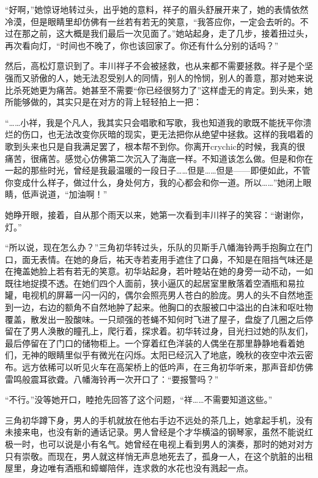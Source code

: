 \documentclass{article}
\begin{document}
“好啊，”她惊讶地转过头，出乎她的意料，祥子的眉头舒展开来了，她的表情依然冷漠，但是眼睛里却仿佛有一丝若有若无的笑意，“我答应你，一定会去听的。不过在那之前，这大概是我们最后一次见面了。”她站起身，走了几步，接着扭过头，再次看向灯，“时间也不晚了，你也该回家了。你还有什么分别的话吗？”



然后，高松灯意识到了。丰川祥子不会被拯救，也从来都不需要拯救。祥子是个坚强而又骄傲的人，她无法忍受别人的同情，别人的怜悯，别人的善意，那对她来说比杀死她更为痛苦。她甚至不需要“你已经很努力了”这样虚无的肯定。到头来，她所能够做的，其实只是在对方的背上轻轻拍上一把：



“……小祥，我是个凡人，我其实只会唱歌和写歌，我也知道我的歌既不能抚平你溃烂的伤口，也无法改变你灰暗的现实，更无法把你从绝望中拯救。这样的我唱着的歌到头来也只是自我满足罢了，根本帮不到你。你离开crychic的时候，我真的很痛苦，很痛苦。感觉心仿佛第二次沉入了海底一样。不知道该怎么做。但是和你在一起的那些时光，曾经是我最温暖的一段日子……但是……但是——即便如此，不管你变成什么样子，做过什么，身处何方，我的心都会和你一道。所以……”她闭上眼睛，低声说道，“加油啊！”



她睁开眼，接着，自从那个雨天以来，她第一次看到丰川祥子的笑容：“谢谢你，灯。”



\newpage



“所以说，现在怎么办？”三角初华转过头，乐队的贝斯手八幡海铃两手抱胸立在门口，面无表情。在她的身后，祐天寺若麦用手遮住了口鼻，不知是在阻挡气味还是在掩盖她脸上若有若无的笑意。初华站起身，若叶睦站在她的身旁一动不动，一如既往地捉摸不透。在她们四个人面前，狭小逼仄的起居室里散落着空酒瓶和易拉罐，电视机的屏幕一闪一闪的，偶尔会照亮男人苍白的脸庞。男人的头不自然地歪到一边，右边的额角不自然地肿了起来。他胸口的衣服被口中溢出的白沫和呕吐物覆盖，散发出一股酸味。一只顽强的苍蝇不知何时飞进了屋子，盘旋了几圈之后停留在了男人涣散的瞳孔上，爬行着，探求着。初华转过身，目光扫过她的队友们，最后停留在了门口的储物柜上。一个穿着红色洋装的人偶坐在那里静静地看着她们，无神的眼睛里似乎有微光在闪烁。太阳已经沉入了地底，晚秋的夜空中浓云密布。远方依稀可以听见火车在高架桥上的低吟声，在三角初华听来，那声音却仿佛雷鸣般震耳欲聋。八幡海铃再一次开口了：“要报警吗？”



“不行。”没等她开口，睦抢先回答了这个问题，“祥……不需要知道这些。”



三角初华蹲下身，男人的手机就放在他右手边不远处的茶几上，她拿起手机，没有未接来电，也没有新的通话记录。男人曾经是个才华横溢的钢琴家，虽然不能说红极一时，也可以说是小有名气。她曾经在电视上看到男人的演奏，那时的她对对方只有崇敬。而现在，男人就这样悄无声息地死去了，孤身一人，在这个肮脏的出租屋里，身边唯有酒瓶和蟑螂陪伴，连求救的水花也没有溅起一点。
\end{document}
